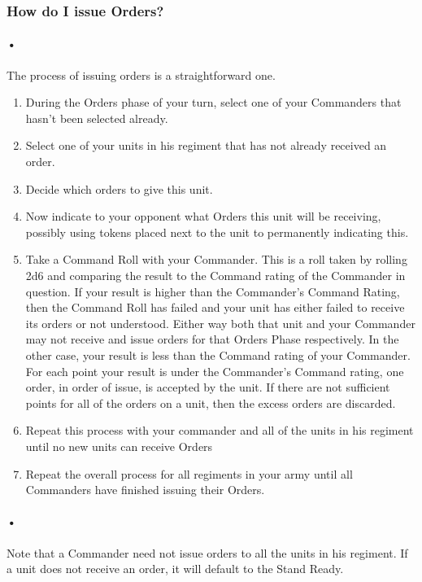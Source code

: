 \documentclass{article}
\begin{document}
\subsubsection{How do I issue Orders?}
\paragraph{•}
The process of issuing orders is a straightforward one. 

\begin{enumerate}
\item During the Orders phase of your turn, select one of your Commanders that hasn't been selected already.
\item Select one of your units in his regiment that has not already received an order.
\item Decide which orders to give this unit.
\item Now indicate to your opponent what Orders this unit will be receiving, possibly using tokens placed next to the unit to permanently indicating this.
\item Take a Command Roll with your Commander. This is a roll taken by rolling 2d6 and comparing the result to the Command rating of the Commander in question. If your result is higher than the Commander's Command Rating, then the Command Roll has failed and your unit has either failed to receive its orders or not understood. Either way both that unit and your Commander may not receive and issue orders for that Orders Phase respectively. In the other case, your result is less than the Command rating of your Commander. For each point your result is under the Commander's Command rating, one order, in order of issue, is accepted by the unit. If there are not sufficient points for all of the orders on a unit, then the excess orders are discarded.
\item Repeat this process with your commander and all of the units in his regiment until no new units can receive Orders
\item Repeat the overall process for all regiments in your army until all Commanders have finished issuing their Orders.
\end{enumerate}

\paragraph{•}
Note that a Commander need not issue orders to all the units in his regiment. If a unit does not receive an order, it will default to the Stand Ready.
\end{document}
